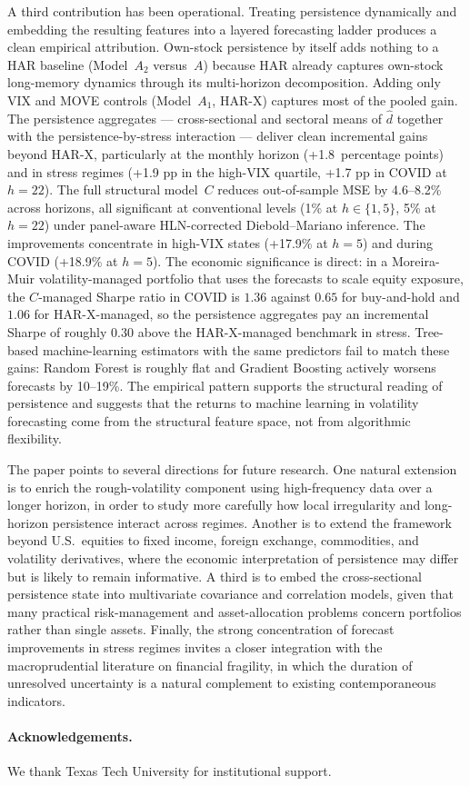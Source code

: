 \documentclass[11pt,a4paper]{article}
\newcommand{\dhat}{\hat d}
\begin{document}
A third contribution has been operational. Treating persistence
dynamically and embedding the resulting features into a layered
forecasting ladder produces a clean empirical attribution. Own-stock
persistence by itself adds nothing to a HAR baseline (Model~$A_2$
versus~$A$) because HAR already captures own-stock long-memory
dynamics through its multi-horizon decomposition. Adding only VIX and
MOVE controls (Model~$A_1$, HAR-X) captures most of the pooled gain.
The persistence aggregates --- cross-sectional and sectoral means of
$\dhat$ together with the persistence-by-stress interaction --- deliver
clean incremental gains beyond HAR-X, particularly at the monthly
horizon (+1.8~percentage points) and in stress regimes (+1.9 pp in the
high-VIX quartile, +1.7 pp in COVID at $h=22$). The full structural
model~$C$ reduces out-of-sample MSE by 4.6--8.2\% across horizons,
all significant at conventional levels (1\% at $h\in\{1,5\}$, 5\% at $h=22$) under panel-aware HLN-corrected
Diebold--Mariano inference. The improvements concentrate in high-VIX
states (+17.9\% at $h=5$) and during COVID (+18.9\% at $h=5$). The
economic significance is direct: in a Moreira-Muir volatility-managed
portfolio that uses the forecasts to scale equity exposure, the
$C$-managed Sharpe ratio in COVID is $1.36$ against $0.65$ for
buy-and-hold and $1.06$ for HAR-X-managed, so the persistence
aggregates pay an incremental Sharpe of roughly $0.30$ above the
HAR-X-managed benchmark in stress. Tree-based machine-learning
estimators with the same predictors fail to match these gains: Random
Forest is roughly flat and Gradient Boosting actively worsens
forecasts by 10--19\%. The empirical pattern supports the structural
reading of persistence and suggests that the returns to machine
learning in volatility forecasting come from the structural feature
space, not from algorithmic flexibility.

The paper points to several directions for future research. One natural
extension is to enrich the rough-volatility component using
high-frequency data over a longer horizon, in order to study more
carefully how local irregularity and long-horizon persistence interact
across regimes. Another is to extend the framework beyond U.S.\
equities to fixed income, foreign exchange, commodities, and volatility
derivatives, where the economic interpretation of persistence may
differ but is likely to remain informative. A third is to embed the
cross-sectional persistence state into multivariate covariance and
correlation models, given that many practical risk-management and
asset-allocation problems concern portfolios rather than single
assets. Finally, the strong concentration of forecast improvements in
stress regimes invites a closer integration with the macroprudential
literature on financial fragility, in which the duration of
unresolved uncertainty is a natural complement to existing
contemporaneous indicators.

\paragraph{Acknowledgements.}
We thank Texas Tech University for institutional support.



\end{document}
